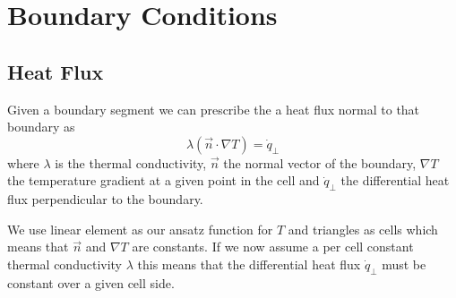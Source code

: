 \chapter{Boundary Conditions}

\section{Heat Flux}
Given a boundary segment we can prescribe the a heat flux normal to that boundary as
\begin{equation}
	\lambda \left(\vec{n} \cdot \nabla T \right) = \dot{q}_{\perp}
\end{equation}
where $\lambda$ is the thermal conductivity, $\vec{n}$ the normal vector of the boundary, $\nabla T$ the temperature gradient at a given point in the cell and $\dot{q}_{\perp}$ the differential heat flux perpendicular to the boundary.

We use linear element as our ansatz function for $T$ and triangles as cells which means that $\vec{n}$ and $\nabla T$ are constants.
If we now assume a per cell constant thermal conductivity $\lambda$ this means that the differential heat flux $\dot{q}_{\perp}$ must be constant over a given cell side.

